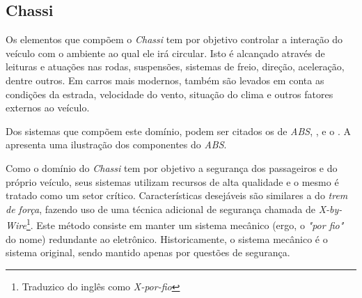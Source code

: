 
%

\subsection{Chassi}

Os elementos que compõem o \emph{Chassi} tem por objetivo controlar a interação do veículo com o ambiente ao qual ele irá circular. Isto é alcançado através de leituras e atuações nas rodas, suspensões, sistemas de freio, direção, aceleração, dentre outros. Em carros mais modernos, também são levados em conta as condições da estrada, velocidade do vento, situação do clima e outros fatores externos ao veículo.

Dos sistemas que compõem este domínio, podem ser citados os de \emph{ABS}, ,  e o . A  apresenta uma ilustração dos componentes do \emph{ABS}.


Como o domínio do \emph{Chassi} tem por objetivo a segurança dos passageiros e do próprio veículo, seus sistemas utilizam recursos de alta qualidade e o mesmo é tratado como um setor crítico. Características desejáveis são similares a do \emph{trem de força}, fazendo uso de uma técnica adicional de segurança chamada de \emph{X-by-Wire}\footnote{Traduzico do inglês como \emph{X-por-fio}}. Este método consiste em manter um sistema mecânico (ergo, o \emph{"por fio"} do nome) redundante ao eletrônico. Historicamente, o sistema mecânico é o sistema original, sendo mantido apenas por questões de segurança.

